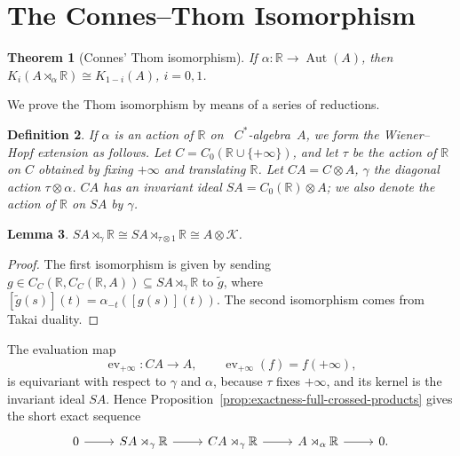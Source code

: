 \documentclass{book}
\newtheorem{definition}{Definition}[section]
\newtheorem{lemma}[definition]{Lemma}
\newtheorem{theorem}[definition]{Theorem}
\def\cstar{\(C^*\)-algebra}
\begin{document}
\section{The Connes--Thom Isomorphism}
\begin{theorem}[Connes' Thom isomorphism]\label{ConnesThomIsomorphism}
  If \(\alpha:\mathbb{R}\to\operatorname{Aut}(A)\), then \(K_i(A\rtimes_\alpha\mathbb{R})\cong K_{1-i}(A)\), \(i=0,1\).
\end{theorem}
We prove the Thom isomorphism by means of a series of reductions.

\begin{definition}
  If \(\alpha\) is an action of \(\mathbb{R}\) on \ \cstar\ \(A\), we form the
  \textnormal{Wiener--Hopf} extension as follows. Let \(C=C_0(\mathbb{R}\cup\{+\infty\})\), and let \(\tau\)
  be the action of \(\mathbb{R}\) on \(C\) obtained by fixing \(+\infty\) and translating \(\mathbb{R}\).
  Let \(CA=C\otimes A\), \(\gamma\) the diagonal action \(\tau\otimes\alpha\).
  \(CA\) has an invariant ideal \(SA=C_0(\mathbb{R})\otimes A\);
  we also denote the action of \(\mathbb{R}\) on \(SA\) by \(\gamma\).
\end{definition}
\begin{lemma}
  \(SA\rtimes_\gamma\mathbb{R}\cong SA\rtimes_{\tau\otimes1}\mathbb{R}\cong A\otimes\mathcal{K}\).
\end{lemma}
\begin{proof}
  The first isomorphism is given by sending \(g\in C_C(\mathbb{R},C_C(\mathbb{R},A))\subseteq SA\rtimes_\gamma\mathbb{R}\)
  to \(\tilde{g}\), where \([\tilde{g}(s)](t)=\alpha_{-t}([g(s)](t))\).
  The second isomorphism comes from Takai duality.
\end{proof}

The evaluation map
\[
  \operatorname{ev}_{+\infty}:CA\longrightarrow A,
  \qquad
  \operatorname{ev}_{+\infty}(f)=f(+\infty),
\]
is equivariant with respect to \(\gamma\) and \(\alpha\), because
\(\tau\) fixes \(+\infty\), and its kernel is the invariant ideal
\(SA\). Hence Proposition~\ref{prop:exactness-full-crossed-products}
gives the short exact sequence
\[
  \begin{tikzcd}
    0\arrow[r]
    &SA\rtimes_\gamma\mathbb R\arrow[r]
    &CA\rtimes_\gamma\mathbb R\arrow[r]
    &A\rtimes_\alpha\mathbb R\arrow[r]
    &0.
  \end{tikzcd}
\]
\end{document}
